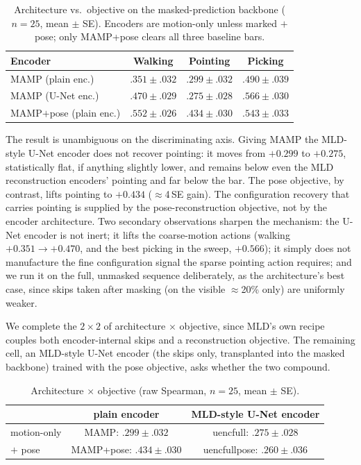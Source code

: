 \documentclass[letterpaper]{article} %
\begin{document}
\begin{table}[h]
\centering
\caption{Architecture vs.\ objective on the masked-prediction backbone ($n=25$, mean $\pm$ SE).
Encoders are motion-only unless marked $+$pose; only MAMP+pose clears all three baseline bars.}
\small
\setlength{\tabcolsep}{3pt}
\begin{tabular}{lccc}
\toprule
Encoder & Walking & Pointing & Picking \\
\midrule
MAMP (plain enc.)        & $.351{\scriptstyle\pm}.032$ & $.299{\scriptstyle\pm}.032$ & $.490{\scriptstyle\pm}.039$ \\
MAMP (U-Net enc.)        & $.470{\scriptstyle\pm}.029$ & $.275{\scriptstyle\pm}.028$ & $.566{\scriptstyle\pm}.030$ \\
MAMP$+$pose (plain enc.) & $\mathbf{.552{\scriptstyle\pm}.026}$ & $\mathbf{.434{\scriptstyle\pm}.030}$ & $\mathbf{.543{\scriptstyle\pm}.033}$ \\
\bottomrule
\end{tabular}
\end{table}

The result is unambiguous on the discriminating axis. Giving MAMP the MLD-style U-Net encoder
{does not recover pointing}: it moves from $+0.299$ to $+0.275$, statistically flat, if
anything slightly lower, and remains below even the MLD reconstruction encoders' pointing and far
below the bar. The pose {objective}, by contrast, lifts pointing to $+0.434$ ($\approx$4\,SE
gain). {The configuration recovery that carries pointing is supplied by the
pose-reconstruction objective, not by the encoder architecture.} Two secondary observations sharpen
the mechanism: the U-Net encoder is not inert; it lifts the coarse-motion actions (walking $+0.351
\to +0.470$, and the best picking in the sweep, $+0.566$); it simply does not manufacture the fine
configuration signal the sparse pointing action requires; and we run it on the full, unmasked
sequence deliberately, as the architecture's best case, since skips taken after masking (on the
visible $\approx$20\% only) are uniformly weaker.

We complete the $2\times 2$ of architecture $\times$ objective, since MLD's own recipe couples both
encoder-internal skips and a reconstruction objective. The remaining cell, an MLD-style U-Net encoder
(the skips only, transplanted into the masked backbone) trained {with} the pose objective, asks
whether the two compound.

\begin{table}[h]
\centering
\setlength{\tabcolsep}{1pt}
\small
\caption{Architecture $\times$ objective (raw Spearman, $n=25$, mean $\pm$ SE).}
\begin{tabular}{lcc}
\toprule
 & plain encoder & MLD-style U-Net encoder \\
\midrule
motion-only & MAMP: $.299{\scriptstyle\pm}.032$ & uencfull: $.275{\scriptstyle\pm}.028$ \\
$+$ pose    & MAMP+pose: $\mathbf{.434{\scriptstyle\pm}.030}$ & uencfullpose: $.260{\scriptstyle\pm}.036$ \\
\bottomrule
\end{tabular}
\end{table}
\end{document}
